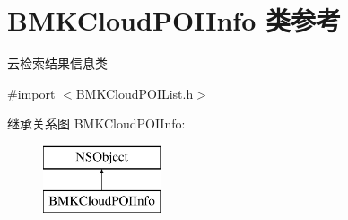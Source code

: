 \hypertarget{interface_b_m_k_cloud_p_o_i_info}{\section{B\-M\-K\-Cloud\-P\-O\-I\-Info 类参考}
\label{interface_b_m_k_cloud_p_o_i_info}
}


云检索结果信息类  




{\ttfamily \#import $<$B\-M\-K\-Cloud\-P\-O\-I\-List.\-h$>$}

继承关系图 B\-M\-K\-Cloud\-P\-O\-I\-Info\-:\begin{figure}[H]
\begin{center}
\leavevmode
\includegraphics[height=2.000000cm]{interface_b_m_k_cloud_p_o_i_info}
\end{center}
\end{figure}
